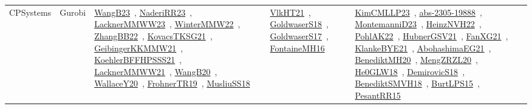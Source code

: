 {\begin{longtable}{lp{3cm}>{\raggedright\arraybackslash}p{6cm}>{\raggedright\arraybackslash}p{6cm}>{\raggedright\arraybackslash}p{8cm}}
CPSystems & Gurobi & \href{works/WangB23.pdf}{WangB23}~\cite{WangB23}, \href{works/NaderiRR23.pdf}{NaderiRR23}~\cite{NaderiRR23}, \href{works/LacknerMMWW23.pdf}{LacknerMMWW23}~\cite{LacknerMMWW23}, \href{works/WinterMMW22.pdf}{WinterMMW22}~\cite{WinterMMW22}, \href{works/ZhangBB22.pdf}{ZhangBB22}~\cite{ZhangBB22}, \href{works/KovacsTKSG21.pdf}{KovacsTKSG21}~\cite{KovacsTKSG21}, \href{works/GeibingerKKMMW21.pdf}{GeibingerKKMMW21}~\cite{GeibingerKKMMW21}, \href{works/KoehlerBFFHPSSS21.pdf}{KoehlerBFFHPSSS21}~\cite{KoehlerBFFHPSSS21}, \href{works/LacknerMMWW21.pdf}{LacknerMMWW21}~\cite{LacknerMMWW21}, \href{works/WangB20.pdf}{WangB20}~\cite{WangB20}, \href{works/WallaceY20.pdf}{WallaceY20}~\cite{WallaceY20}, \href{works/FrohnerTR19.pdf}{FrohnerTR19}~\cite{FrohnerTR19}, \href{works/MusliuSS18.pdf}{MusliuSS18}~\cite{MusliuSS18} & \href{works/VlkHT21.pdf}{VlkHT21}~\cite{VlkHT21}, \href{works/GoldwaserS18.pdf}{GoldwaserS18}~\cite{GoldwaserS18}, \href{works/GoldwaserS17.pdf}{GoldwaserS17}~\cite{GoldwaserS17}, \href{works/FontaineMH16.pdf}{FontaineMH16}~\cite{FontaineMH16} & \href{works/KimCMLLP23.pdf}{KimCMLLP23}~\cite{KimCMLLP23}, \href{works/abs-2305-19888.pdf}{abs-2305-19888}~\cite{abs-2305-19888}, \href{works/MontemanniD23.pdf}{MontemanniD23}~\cite{MontemanniD23}, \href{works/HeinzNVH22.pdf}{HeinzNVH22}~\cite{HeinzNVH22}, \href{works/PohlAK22.pdf}{PohlAK22}~\cite{PohlAK22}, \href{works/HubnerGSV21.pdf}{HubnerGSV21}~\cite{HubnerGSV21}, \href{works/FanXG21.pdf}{FanXG21}~\cite{FanXG21}, \href{works/KlankeBYE21.pdf}{KlankeBYE21}~\cite{KlankeBYE21}, \href{works/AbohashimaEG21.pdf}{AbohashimaEG21}~\cite{AbohashimaEG21}, \href{works/BenediktMH20.pdf}{BenediktMH20}~\cite{BenediktMH20}, \href{works/MengZRZL20.pdf}{MengZRZL20}~\cite{MengZRZL20}, \href{works/He0GLW18.pdf}{He0GLW18}~\cite{He0GLW18}, \href{works/DemirovicS18.pdf}{DemirovicS18}~\cite{DemirovicS18}, \href{works/BenediktSMVH18.pdf}{BenediktSMVH18}~\cite{BenediktSMVH18}, \href{works/BurtLPS15.pdf}{BurtLPS15}~\cite{BurtLPS15}, \href{works/PesantRR15.pdf}{PesantRR15}~\cite{PesantRR15}\\

\end{longtable}}
